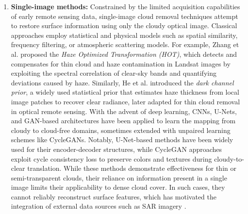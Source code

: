 \begin{enumerate}[label=(\Alph*)]
  \item \textbf{Single-image methods:} Constrained by the limited acquisition capabilities of early remote sensing data, single-image cloud removal techniques attempt to restore surface information using only the cloudy optical image. Classical approaches employ statistical and physical models such as spatial similarity, frequency filtering, or atmospheric scattering models. For example, Zhang et al. \cite{single_variation} proposed the \emph{Haze Optimized Transformation (HOT)}, which detects and compensates for thin cloud and haze contamination in Landsat images by exploiting the spectral correlation of clear-sky bands and quantifying deviations caused by haze. Similarly, He et al. \cite{single_haze_removal_dark_prior} introduced the \emph{dark channel prior}, a widely used statistical prior that estimates haze thickness from local image patches to recover clear radiance, later adapted for thin cloud removal in optical remote sensing. With the advent of deep learning, CNNs, U-Nets, and GAN-based architectures have been applied to learn the mapping from cloudy to cloud-free domains, sometimes extended with unpaired learning schemes like CycleGANs. Notably, U-Net-based methods have been widely used for their encoder-decoder structures, while CycleGAN approaches exploit cycle consistency loss to preserve colors and textures during cloudy-to-clear translation. While these methods demonstrate effectiveness for thin or semi-transparent clouds, their reliance on information present in a single image limits their applicability to dense cloud cover. In such cases, they cannot reliably reconstruct surface features, which has motivated the integration of external data sources such as SAR imagery \cite{CR_Advances_Review_ORS}.


\end{enumerate}
